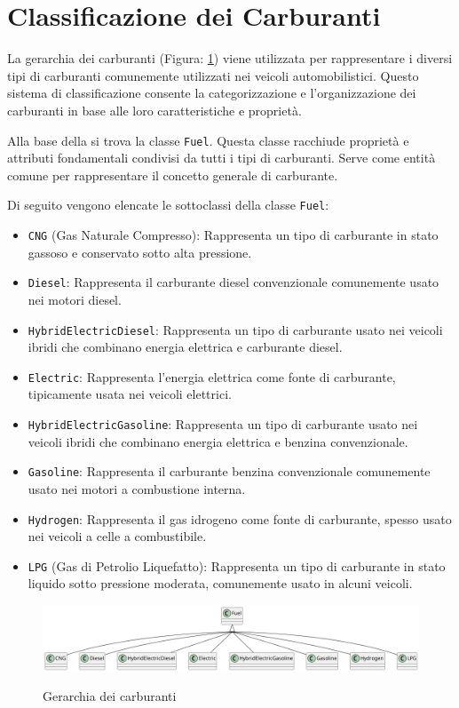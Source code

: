 \section{Classificazione dei Carburanti}

La gerarchia dei carburanti (Figura: \ref{fig:carpedia-fuel}) viene utilizzata per rappresentare i diversi tipi di carburanti comunemente utilizzati nei veicoli automobilistici. Questo sistema di classificazione consente la categorizzazione e l'organizzazione dei carburanti in base alle loro caratteristiche e proprietà.

Alla base della si trova la classe \texttt{Fuel}. Questa classe racchiude proprietà e attributi fondamentali condivisi da tutti i tipi di carburanti. Serve come entità comune per rappresentare il concetto generale di carburante.

Di seguito vengono elencate le sottoclassi della classe \texttt{Fuel}:

\begin{itemize}
    \item \texttt{CNG} (Gas Naturale Compresso): Rappresenta un tipo di carburante in stato gassoso e conservato sotto alta pressione.
    \item \texttt{Diesel}: Rappresenta il carburante diesel convenzionale comunemente usato nei motori diesel.
    \item \texttt{HybridElectricDiesel}: Rappresenta un tipo di carburante usato nei veicoli ibridi che combinano energia elettrica e carburante diesel.
    \item \texttt{Electric}: Rappresenta l'energia elettrica come fonte di carburante, tipicamente usata nei veicoli elettrici.
    \item \texttt{HybridElectricGasoline}: Rappresenta un tipo di carburante usato nei veicoli ibridi che combinano energia elettrica e benzina convenzionale.
    \item \texttt{Gasoline}: Rappresenta il carburante benzina convenzionale comunemente usato nei motori a combustione interna.
    \item \texttt{Hydrogen}: Rappresenta il gas idrogeno come fonte di carburante, spesso usato nei veicoli a celle a combustibile.
    \item \texttt{LPG} (Gas di Petrolio Liquefatto): Rappresenta un tipo di carburante in stato liquido sotto pressione moderata, comunemente usato in alcuni veicoli.
\end{itemize}

\begin{figure}[H]
    \caption{Gerarchia dei carburanti}
    \includegraphics[width=\textwidth]{figures/carpedia-fuel.png}
    \label{fig:carpedia-fuel}
\end{figure}

